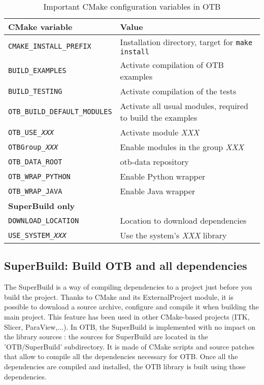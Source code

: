 \begin{center}
\begin{tiny}
\begin{table}[!htbp]
\begin{tabular}{p{}p{}}
\hline
\textbf{CMake variable} & \textbf{Value} \\
\hline
\texttt{CMAKE\_INSTALL\_PREFIX}         & Installation directory, target for \texttt{make install} \\
\texttt{BUILD\_EXAMPLES}                & Activate compilation of OTB examples \\
\texttt{BUILD\_TESTING}                 & Activate compilation of the tests \\
\texttt{OTB\_BUILD\_DEFAULT\_MODULES}   & Activate all usual modules, required to build the examples \\
\texttt{OTB\_USE\_\textit{XXX}}         & Activate module \textit{XXX} \\
\texttt{OTBGroup\_\textit{XXX}}         & Enable modules in the group \textit{XXX} \\
\texttt{OTB\_DATA\_ROOT}                & otb-data repository \\
\texttt{OTB\_WRAP\_PYTHON}              & Enable Python wrapper \\
\texttt{OTB\_WRAP\_JAVA}                & Enable Java wrapper \\

\hline
\multicolumn{2}{l}{\small \textbf{SuperBuild only}} \\ 
\texttt{DOWNLOAD\_LOCATION}             & Location to download dependencies \\
\texttt{USE\_SYSTEM\_\textit{XXX}}      & Use the system's \textit{XXX} library \\

\hline
\end{tabular}
\caption{Important CMake configuration variables in OTB}
\label{tab:installation-cmake-variables}
\end{table}
\end{tiny}
\end{center}

\subsection{SuperBuild: Build OTB and all dependencies}
\label{sec:installation-linux-superbuild}

The SuperBuild is a way of compiling dependencies to a project just before you build the project. Thanks to CMake and
its ExternalProject module, it is possible to download a source archive, configure and compile it when building
the main project. This feature has been used in other CMake-based projects (ITK, Slicer, ParaView,...).
In OTB, the SuperBuild is implemented with no impact on the library sources : the sources for SuperBuild are located in
the 'OTB/SuperBuild' subdirectory. It is made of CMake scripts and source patches that allow to compile all the
dependencies necessary for OTB. Once all the dependencies are compiled and installed, the OTB library is built using
those dependencies.

